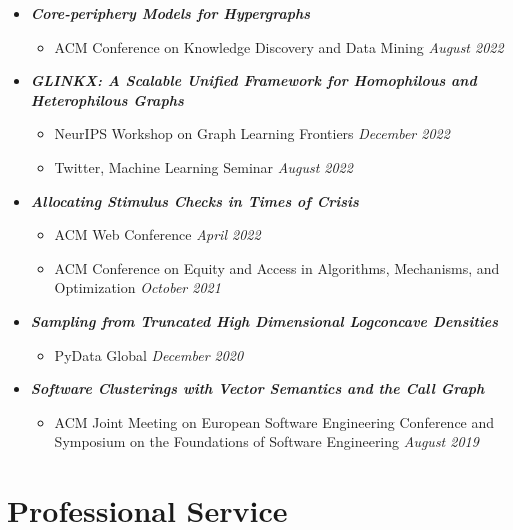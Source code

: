 \documentclass[margin]{res}
\newcommand{\bemph}[1]{\textbf{\emph{#1}}}
\begin{document}
\begin{resume}
\begin{itemize}[nosep]
	\item \bemph{Core-periphery Models for Hypergraphs}
	\begin{itemize}[nosep]
		\item ACM Conference on Knowledge Discovery and Data Mining \hfill \emph{August 2022}
	\end{itemize}
	
	\item \bemph{GLINKX: A Scalable Unified Framework for Homophilous and Hetero\-philous Graphs}
	\begin{itemize}[nosep]
		\item NeurIPS Workshop on Graph Learning Frontiers  \hfill \emph{December 2022}
		\item Twitter, Machine Learning Seminar \hfill \emph{August 2022}
		
	\end{itemize}

 
	\item \bemph{Allocating Stimulus Checks in Times of Crisis} 
	\begin{itemize}[nosep]
		\item ACM Web Conference \hfill \emph{April 2022}
		\item ACM Conference on Equity and Access in Algorithms, Mechanisms, and Optimization \hfill \emph{October 2021}
	\end{itemize}

	\item \bemph{Sampling from Truncated High Dimensional Logconcave Densities}
	\begin{itemize}[nosep]
		\item PyData Global \hfill \emph{December 2020}
	\end{itemize}
	
	\item \bemph{Software Clusterings with Vector Semantics and the Call Graph}
	\begin{itemize}[nosep]
		\item ACM Joint Meeting on European Software Engineering Conference and Symposium on the Foundations of Software Engineering \hfill \emph{August 2019}
	\end{itemize} 
	
\end{itemize}

\section{Professional Service}


\end{resume}
\end{document}
